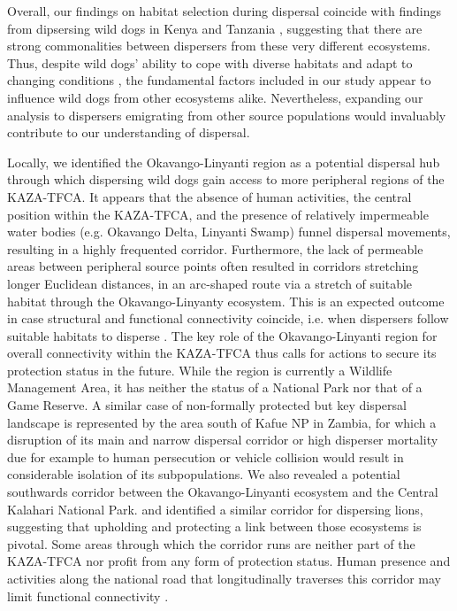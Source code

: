 \documentclass[abstract=on,10pt,a4paper,bibliography=totocnumbered]{article}
\begin{document}
Overall, our findings on habitat selection during dispersal coincide with
findings from dipsersing wild dogs in Kenya \citep{Oneill.2020} and Tanzania
\citep{Masenga.2016}, suggesting that there are strong commonalities between
dispersers from these very different ecosystems. Thus, despite wild dogs'
ability to cope with diverse habitats and adapt to changing conditions
\citep{Woodroffe.2011}, the fundamental factors included in our study appear to
influence wild dogs from other ecosystems alike. Nevertheless, expanding our
analysis to dispersers emigrating from other source populations would invaluably
contribute to our understanding of dispersal.

Locally, we identified the Okavango-Linyanti region as a potential dispersal hub
through which dispersing wild dogs gain access to more peripheral regions of the
KAZA-TFCA. It appears that the absence of human activities, the central position
within the KAZA-TFCA, and the presence of relatively impermeable water bodies
(e.g. Okavango Delta, Linyanti Swamp) funnel dispersal movements, resulting in a
highly frequented corridor. Furthermore, the lack of permeable areas between
peripheral source points often resulted in corridors stretching longer Euclidean
distances, in an arc-shaped route via a stretch of suitable habitat through the
Okavango-Linyanty ecosystem. This is an expected outcome in case structural and
functional connectivity coincide, i.e. when dispersers follow suitable habitats
to disperse \citep{Fattebert.2015, Hauenstein.2019}. The key role of the
Okavango-Linyanti region for overall connectivity within the KAZA-TFCA thus
calls for actions to secure its protection status in the future. While the
region is currently a Wildlife Management Area, it has neither the status of a
National Park nor that of a Game Reserve. A similar case of non-formally
protected but key dispersal landscape is represented by the area south of Kafue
NP in Zambia, for which a disruption of its main and narrow dispersal corridor
or high disperser mortality due for example to human persecution or vehicle
collision would result in considerable isolation of its subpopulations. We also
revealed a potential southwards corridor between the Okavango-Linyanti ecosystem
and the Central Kalahari National Park. \cite{Elliot.2014} and
\cite{Cushman.2018} identified a similar corridor for dispersing lions,
suggesting that upholding and protecting a link between those ecosystems is
pivotal. Some areas through which the corridor runs are neither part of the
KAZA-TFCA nor profit from any form of protection status. Human presence and
activities along the national road that longitudinally traverses this corridor
may limit functional connectivity \citep{Cozzi.2020}.
\end{document}
